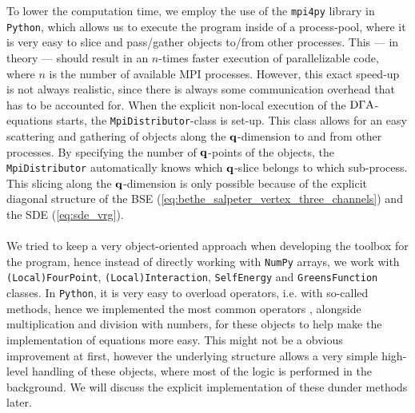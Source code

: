 \documentclass[../../main.tex]{subfiles}
\begin{document}
To lower the computation time, we employ the use of the \texttt{mpi4py} library in \texttt{Python}, which allows us to execute the program inside of a process-pool, where it is very easy to slice and pass/gather objects to/from other processes. This --- in theory --- should result in an $n$-times faster execution of parallelizable code, where $n$ is the number of available MPI processes. However, this exact speed-up is not always realistic, since there is always some communication overhead that has to be accounted for. When the explicit non-local execution of the $\text{D}\Gamma\text{A}$-equations starts, the \texttt{MpiDistributor}-class is set-up. This class allows for an easy scattering and gathering of objects along the $\textbf{q}$-dimension to and from other processes. By specifying the number of $\textbf{q}$-points of the objects, the \texttt{MpiDistributor} automatically knows which $\textbf{q}$-slice belongs to which sub-process. This slicing along the $\textbf{q}$-dimension is only possible because of the explicit diagonal structure of the BSE (\ref{eq:bethe_salpeter_vertex_three_channels}) and the SDE (\ref{eq:sde_vrg}).
\\\\
We tried to keep a very object-oriented approach when developing the toolbox for the program, hence instead of directly working with \texttt{NumPy} arrays, we work with \texttt{(Local)FourPoint}, \texttt{(Local)Interaction}, \texttt{SelfEnergy} and \texttt{GreensFunction} classes. In \texttt{Python}, it is very easy to overload operators, i.e. with so-called  methods, hence we implemented the most common operators , alongside multiplication and division with numbers, for these objects to help make the implementation of equations more easy. This might not be a obvious improvement at first, however the underlying structure allows a very simple high-level handling of these objects, where most of the logic is performed in the background. We will discuss the explicit implementation of these dunder methods later.
\\\\
\end{document}
